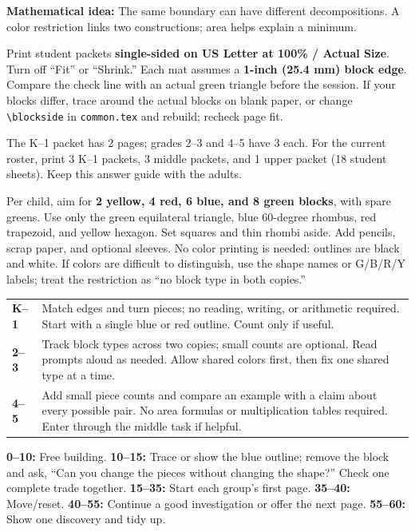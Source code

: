 \documentclass[11pt]{article}
\newcommand{\Subhead}[1]{\par\vspace{4pt}{\large\bfseries #1}\par}
\begin{document}
\textbf{Mathematical idea:} The same boundary can have different decompositions. A color restriction links two constructions; area helps explain a minimum.
\Subhead{Print and prepare}
Print student packets \textbf{single-sided on US Letter at 100\% / Actual Size}. Turn off ``Fit'' or ``Shrink.'' Each mat assumes a \textbf{1-inch (25.4 mm) block edge}. Compare the check line with an actual green triangle before the session. If your blocks differ, trace around the actual blocks on blank paper, or change \texttt{\textbackslash blockside} in \texttt{common.tex} and rebuild; recheck page fit.

The K--1 packet has 2 pages; grades 2--3 and 4--5 have 3 each. For the current roster, print 3 K--1 packets, 3 middle packets, and 1 upper packet (18 student sheets). Keep this answer guide with the adults.

Per child, aim for \textbf{2 yellow, 4 red, 6 blue, and 8 green blocks}, with spare greens. Use only the green equilateral triangle, blue 60-degree rhombus, red trapezoid, and yellow hexagon. Set squares and thin rhombi aside. Add pencils, scrap paper, and optional sleeves. No color printing is needed: outlines are black and white. If colors are difficult to distinguish, use the shape names or G/B/R/Y labels; treat the restriction as ``no block type in both copies.''
\Subhead{Choose an entry point}
\begin{tabularx}{\linewidth}{@{}p{.62in}X@{}}
\textbf{K--1} & Match edges and turn pieces; no reading, writing, or arithmetic required. Start with a single blue or red outline. Count only if useful.\\[5pt]
\textbf{2--3} & Track block types across two copies; small counts are optional. Read prompts aloud as needed. Allow shared colors first, then fix one shared type at a time.\\[5pt]
\textbf{4--5} & Add small piece counts and compare an example with a claim about every possible pair. No area formulas or multiplication tables required. Enter through the middle task if helpful.
\end{tabularx}
\Subhead{A flexible hour}
\textbf{0--10:} Free building. \textbf{10--15:} Trace or show the blue outline; remove the block and ask, ``Can you change the pieces without changing the shape?'' Check one complete trade together. \textbf{15--35:} Start each group's first page. \textbf{35--40:} Move/reset. \textbf{40--55:} Continue a good investigation or offer the next page. \textbf{55--60:} Show one discovery and tidy up.
\end{document}
